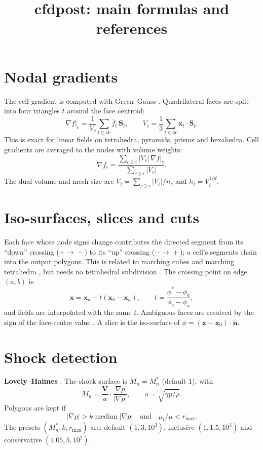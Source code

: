 \documentclass[10pt,a4paper]{article}
\title{\textbf{cfdpost}: main formulas and references}
\date{}
\newcommand{\vect}[1]{\bm{#1}}
\begin{document}
\maketitle
\vspace{-1.5cm}

\section*{Nodal gradients}
The cell gradient is computed with Green--Gauss \cite{blazek2015cfd,barth1989upwind}. Quadrilateral
faces are split into four triangles $t$ around the face centroid:
\[
  \nabla f|_c=\frac{1}{V_c}\sum_{t\in\partial c}\bar f_t\,\vect S_t,\qquad
  V_c=\frac13\sum_{t\in\partial c}\bar{\vect x}_t\cdot\vect S_t .
\]
This is exact for linear fields on tetrahedra, pyramids, prisms and hexahedra. Cell gradients
are averaged to the nodes with volume weights:
\[
  \nabla f_i=\frac{\sum_{c\ni i}|V_c|\,\nabla f|_c}{\sum_{c\ni i}|V_c|}.
\]
The dual volume and mesh size are $V_i=\sum_{c\ni i}|V_c|/n_c$ and $h_i=V_i^{1/d}$.

\section*{Iso-surfaces, slices and cuts}
Each face whose node signs change contributes the directed segment from its ``down'' crossing
($+\!\to\!-$) to its ``up'' crossing ($-\!\to\!+$); a cell's segments chain into the output
polygons. This is related to marching cubes and marching tetrahedra
\cite{lorensen1987marching,doi1991tetrahedra}, but needs no tetrahedral subdivision
\cite{dompierre1999subdivide}. The crossing point on edge $(a,b)$ is
\[
  \vect x=\vect x_a+t(\vect x_b-\vect x_a),\qquad t=\frac{\phi^\ast-\phi_a}{\phi_b-\phi_a},
\]
and fields are interpolated with the same $t$. Ambiguous faces are resolved by the sign of the
face-centre value \cite{nielson1991asymptotic}. A slice is the iso-surface of
$\phi=(\vect x-\vect x_0)\cdot\hat{\vect n}$.

\section*{Shock detection}
\textbf{Lovely--Haimes} \cite{lovely1999shock,ma1996shock}. The shock surface is
$M_n=M_n^\ast$ (default $1$), with
\[
  M_n=\frac{\vect V}{a}\cdot\frac{\nabla p}{|\nabla p|},\qquad a=\sqrt{\gamma p/\rho}.
\]
Polygons are kept if
\[
  |\nabla p|>k\operatorname{median}|\nabla p|\quad\text{and}\quad \mu_t/\mu<r_{\max}.
\]
The presets $(M_n^\ast,k,r_{\max})$ are: default $(1,3,10^3)$, inclusive $(1,1.5,10^3)$ and
conservative $(1.05,5,10^2)$.
\end{document}
